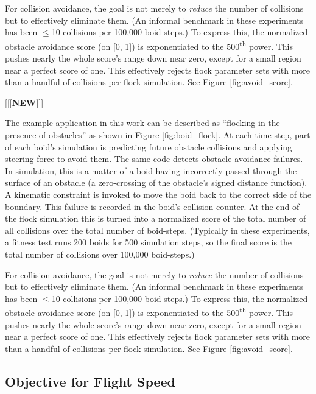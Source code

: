 \documentclass[letterpaper]{article}
\begin{document}
For collision avoidance, the goal is not merely to \textit{reduce} the number of collisions but to effectively eliminate them. (An informal benchmark in these experiments has been {$\leq$}10 collisions per 100,000 boid-steps.) To express this, the normalized obstacle avoidance score (on [0, 1]) is exponentiated to the 500\textsuperscript{th} power. This pushes nearly the whole score's range down near zero, except for a small region near a perfect score of one. This effectively rejects flock parameter sets with more than a handful of collisions per flock simulation. See Figure \ref{fig:avoid_score}.

[[[\textbf{NEW}]]]

The example application in this work can be described as ``flocking in the presence of obstacles'' as shown in Figure \ref{fig:boid_flock}. At each time step, part of each boid's simulation is predicting future obstacle collisions and applying steering force to avoid them. The same code detects obstacle avoidance failures. In simulation, this is a matter of a boid having incorrectly passed through the surface of an obstacle (a zero-crossing of the obstacle's signed distance function). A kinematic constraint is invoked to move the boid back to the correct side of the boundary. This failure is recorded in the boid's collision counter. At the end of the flock simulation this is turned into a normalized score of the total number of all collisions over the total number of boid-steps. (Typically in these experiments, a fitness test runs 200 boids for 500 simulation steps, so the final score is the total number of collisions over 100,000 boid-steps.) 

For collision avoidance, the goal is not merely to \textit{reduce} the number of collisions but to effectively eliminate them. (An informal benchmark in these experiments has been {$\leq$}10 collisions per 100,000 boid-steps.) To express this, the normalized obstacle avoidance score (on [0, 1]) is exponentiated to the 500\textsuperscript{th} power. This pushes nearly the whole score's range down near zero, except for a small region near a perfect score of one. This effectively rejects flock parameter sets with more than a handful of collisions per flock simulation. See Figure \ref{fig:avoid_score}.

\subsection{Objective for Flight Speed}
\label{subsec:speed_objective}
\end{document}
